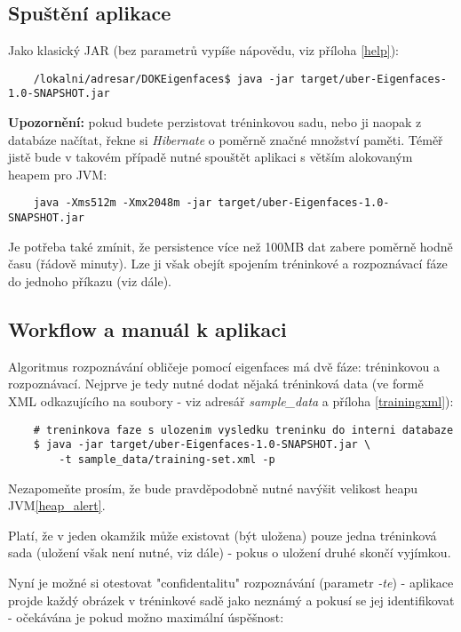 \documentclass[10pt,a4paper]{article}
\begin{document}
\subsection{Spuštění aplikace} 

Jako klasický JAR (bez parametrů vypíše nápovědu, viz příloha \ref{help}):

	\begin{verbatim}
	/lokalni/adresar/DOKEigenfaces$ java -jar target/uber-Eigenfaces-1.0-SNAPSHOT.jar
	\end{verbatim} 

\label{heap_alert}
\textbf{Upozornění:} pokud budete perzistovat tréninkovou sadu, nebo ji naopak z databáze načítat, řekne si \textit{Hibernate} o poměrně značné množství paměti. Téměř jistě bude v takovém případě nutné spouštět aplikaci s větším alokovaným heapem pro JVM:

	\begin{verbatim}
	java -Xms512m -Xmx2048m -jar target/uber-Eigenfaces-1.0-SNAPSHOT.jar
	\end{verbatim}
	
Je potřeba také zmínit, že persistence více než 100MB dat zabere poměrně hodně času (řádově minuty). Lze ji však obejít spojením tréninkové a rozpoznávací fáze do jednoho příkazu (viz dále).

\subsection{Workflow a manuál k aplikaci}
\label{manual}
Algoritmus rozpoznávání obličeje pomocí eigenfaces má dvě fáze: tréninkovou a rozpoznávací. Nejprve je tedy nutné dodat nějaká tréninková data (ve formě XML odkazujícího na soubory - viz adresář \textit{sample\_data} a příloha \ref{trainingxml}):
    
	\begin{verbatim}    
    # treninkova faze s ulozenim vysledku treninku do interni databaze
    $ java -jar target/uber-Eigenfaces-1.0-SNAPSHOT.jar \
    	-t sample_data/training-set.xml -p
    \end{verbatim}

Nezapomeňte prosím, že bude pravděpodobně nutné navýšit velikost heapu JVM\ref{heap_alert}.

Platí, že v jeden okamžik může existovat (být uložena) pouze jedna tréninková sada (uložení však není nutné, viz dále) - pokus o uložení druhé skončí vyjímkou.
  
Nyní je možné si otestovat "confidentalitu" rozpoznávání (parametr \textit{-te}) - aplikace projde každý obrázek v tréninkové sadě jako neznámý a pokusí se jej identifikovat - očekávána je pokud možno maximální úspěšnost:
	
\end{document}
